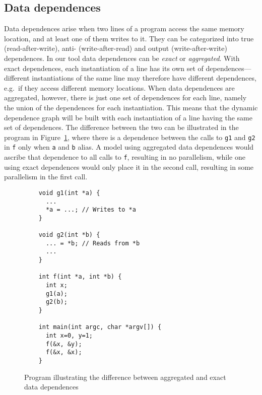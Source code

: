 \subsection{Data dependences}
Data dependences arise when two lines of a program access the same memory location, and at least one of them writes to it.
They can be categorized into true (read-after-write), anti- (write-after-read) and output (write-after-write) dependences.
In our tool data dependences can be \emph{exact} or \emph{aggregated}.
With exact dependences, each instantiation of a line has its own set of dependences---different instantiations of the same line may therefore have different dependences, e.g.\ if they access different memory locations.
When data dependences are aggregated, however, there is just one set of dependences for each line, namely the union of the dependences for each instantiation.
This means that the dynamic dependence graph will be built with each instantiation of a line having the same set of dependences.
The difference between the two can be illustrated in the program in Figure~\ref{datadeps}, where there is a dependence between the calls to \texttt{g1} and \texttt{g2} in \texttt{f} only when \texttt{a} and \texttt{b} alias.
A model using aggregated data dependences would ascribe that dependence to all calls to \texttt{f}, resulting in no parallelism, while one using exact dependences would only place it in the second call, resulting in some parallelism in the first call.

\begin{figure}
  \begin{center}
  \small
  \begin{verbatim}
    void g1(int *a) {
      ...
      *a = ...; // Writes to *a
    }
  
    void g2(int *b) {
      ... = *b; // Reads from *b
      ...
    }

    int f(int *a, int *b) {
      int x;
      g1(a);
      g2(b);
    }

    int main(int argc, char *argv[]) {
      int x=0, y=1;
      f(&x, &y);
      f(&x, &x);
    }
  \end{verbatim}
  \end{center}
  \caption{Program illustrating the difference between aggregated and exact data dependences}
  \label{datadeps}
\end{figure}

